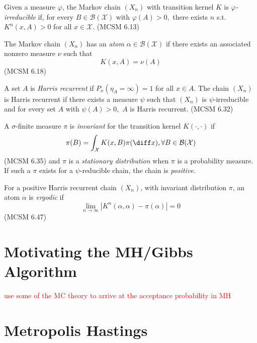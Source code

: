 \begin{definition}
    Given a measure $\varphi$, the Markov chain $(X_n)$ with transition kernel $K$ is \emph{$\varphi$-irreducible} if, for every $B\in\mathcal{B}(\mathcal{X})$ with $\varphi(A)>0,$ there exists $n$ s.t. $K^n(x, A)>0$ for all $x\in\mathcal{X}$. (MCSM 6.13)
\end{definition}

\begin{definition}[Atom]
    The Markov chain $(X_n)$ has an \emph{atom} ${\alpha\in\mathcal{B}(\mathcal{X})}$ if there exists an associated nonzero measure $\nu$ such that $$K(x, A) = \nu(A)$$ (MCSM 6.18)
\end{definition}

\begin{definition}
    A set $A$ is \emph{Harris recurrent} if $P_x(\eta_A = \infty) = 1$ for all $x\in A.$ The chain $(X_n)$ is Harris recurrent if there exists a measure $\psi$ such that $(X_n)$ is $\psi$-irreducible and for every set $A$ with $\psi(A) > 0,$ $A$ is Harris recurrent. (MCSM 6.32)
\end{definition}

\begin{definition}
    A $\sigma$-finite measure $\pi$ is \emph{invariant} for the transition kernel $K(\cdot,\cdot)$ if $$\pi(B) = \int_\mathcal{X} K(x, B)\pi(\diff x), \forall B\in\mathcal{B}(\mathcal{X})$$ (MCSM 6.35) and $\pi$ is a \emph{stationary distribution} when $\pi$ is a probability measure. If such a $\pi$ exists for a $\psi$-reducible chain, the chain is \emph{positive}.
\end{definition}

\begin{definition}[Ergodic]
    For a positive Harris recurrent chain $(X_n)$, with invariant distribution $\pi$, an atom $\alpha$ is \emph{ergodic} if
    $$\lim_{n\to\infty}|K^n(\alpha, \alpha) - \pi(\alpha)| = 0$$ (MCSM 6.47)
\end{definition}

\color{black}

\section{Motivating the MH/Gibbs Algorithm}
\textcolor{red}{use some of the MC theory to arrive at the acceptance probability in MH}

\section{Metropolis Hastings}

